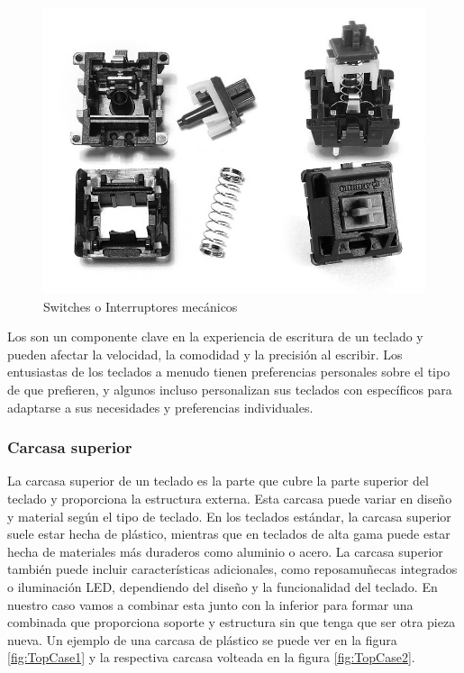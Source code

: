 \begin{figure}[H]
    \centering
    \includegraphics[width=1\textwidth]{imagenes/Capitulos/Cap03/Switches.png}
    \caption{Switches o Interruptores mecánicos \cite{SwitchesImageSource}}
    \label{fig:Switches}
\end{figure}

Los  son un componente clave en la experiencia de escritura de un teclado y pueden afectar la velocidad, la comodidad y la precisión al escribir. Los entusiastas de los teclados a menudo tienen preferencias personales sobre el tipo de  que prefieren, y algunos incluso personalizan sus teclados con  específicos para adaptarse a sus necesidades y preferencias individuales.
\newpage
\subsubsection{Carcasa superior}

La carcasa superior de un teclado es la parte que cubre la parte superior del teclado y proporciona la estructura externa. Esta carcasa puede variar en diseño y material según el tipo de teclado. En los teclados estándar, la carcasa superior suele estar hecha de plástico, mientras que en teclados de alta gama puede estar hecha de materiales más duraderos como aluminio o acero. La carcasa superior también puede incluir características adicionales, como reposamuñecas integrados o iluminación \gls{LED}, dependiendo del diseño y la funcionalidad del teclado. En nuestro caso vamos a combinar esta junto con la inferior para formar una combinada que proporciona soporte y estructura sin que tenga que ser otra pieza nueva. Un ejemplo de una carcasa de plástico se puede ver en la figura \ref{fig:TopCase1} y la respectiva carcasa volteada en la figura \ref{fig:TopCase2}.

